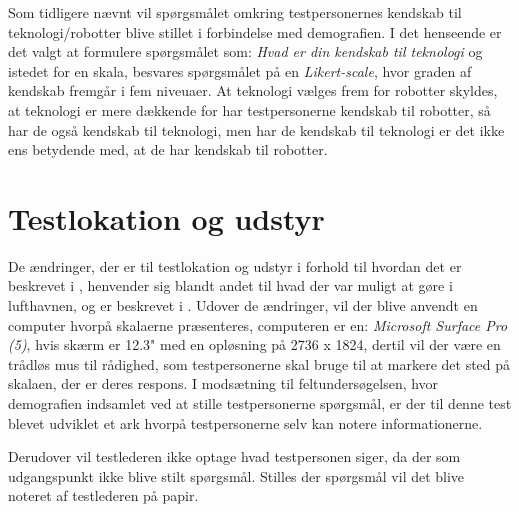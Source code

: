 Som tidligere nævnt vil spørgsmålet omkring testpersonernes kendskab til teknologi/robotter blive stillet i forbindelse med demografien. I det henseende er det valgt at formulere spørgsmålet som: \textit{Hvad er din kendskab til teknologi} og istedet for en skala, besvares spørgsmålet på en \textit{Likert-scale}, hvor graden af kendskab fremgår i fem niveuaer. At teknologi vælges frem for robotter skyldes, at teknologi er mere dækkende for har testpersonerne kendskab til robotter, så har de også kendskab til teknologi, men har de kendskab til teknologi er det ikke ens betydende med, at de har kendskab til robotter.

\section{Testlokation og udstyr}
\label{TestAfSkalaLokationUdstyr}
%
De ændringer, der er til testlokation og udstyr i forhold til hvordan det er beskrevet i , henvender sig blandt andet til hvad der var muligt at gøre i lufthavnen, og er beskrevet i . Udover de ændringer, vil der blive anvendt en computer hvorpå skalaerne præsenteres, computeren er en: \textit{Microsoft Surface Pro (5)}, hvis skærm er 12.3" med en opløsning på 2736 x 1824, dertil vil der være en trådløs mus til rådighed, som testpersonerne skal bruge til at markere det sted på skalaen, der er deres respons. I modsætning til feltundersøgelsen, hvor demografien indsamlet ved at stille testpersonerne spørgsmål, er der til denne test blevet udviklet et ark hvorpå testpersonerne selv kan notere informationerne. 

Derudover vil testlederen ikke optage hvad testpersonen siger, da der som udgangspunkt ikke blive stilt spørgsmål. Stilles der spørgsmål vil det blive noteret af testlederen på papir. 


